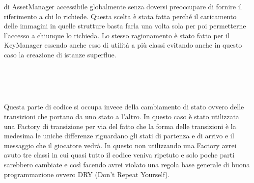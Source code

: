\documentclass[a4paper,12pt]{report}
\begin{document}
    di AssetManager accessibile globalmente senza doversi preoccupare di fornire il riferimento a chi lo richiede.
    Questa scelta è stata fatta perché il caricamento delle immagini in quelle strutture basta farla una volta sola per poi
    permetterne l’accesso a chiunque lo richieda. Lo stesso ragionamento è stato fatto per il KeyManager essendo anche esso
    di utilità a più classi evitando anche in questo caso la creazione di istanze superflue.
    \\
    \\
    \par
    \\
    \\
    \par Questa parte di codice si occupa invece della cambiamento di stato ovvero delle transizioni che portano da uno stato
    a l’altro. In questo caso è stato utilizzata una Factory di transizione per via del fatto che la forma delle transizioni
    è la medesima le uniche differenze riguardano gli stati di partenza e di arrivo e il messaggio che il giocatore vedrà.
    In questo non utilizzando una Factory avrei avuto tre classi in cui quasi tutto il codice veniva ripetuto e solo poche
    parti sarebbero cambiate e così facendo avrei violato una regola base generale di buona programmazione ovvero
    DRY (Don’t Repeat Yourself).
    \\
    \\
    \par
\end{document}
